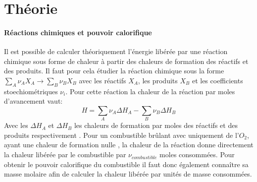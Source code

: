 \section{Théorie}


\paragraph*{Réactions chimiques et pouvoir calorifique}
Il est possible de calculer théoriquement l'énergie libérée par une réaction chimique sous forme de chaleur à partir des chaleurs de formation des réactifs et des produits. Il faut pour cela étudier la réaction chimique sous la forme \mbox{\(\sum_{A} \nu_A X_A \to \sum_{B} \nu_B X_B\)} avec les réactifs \(X_A\), les produits \(X_B\) et les coefficients stoechiométriques \(\nu_i\). Pour cette réaction la chaleur de la réaction par moles d'avancement vaut:
\begin{equation}
    H = \sum_{A} \nu_A \Delta H_A - \sum_{B} \nu_B \Delta H_B
    \label{eq:chaleur_réaction}
\end{equation}
Avec les \(\Delta H_A\) et \(\Delta H_B\) les chaleurs de formation par moles des réactifs et des produits respectivement \cite{cours-thermo}. Pour un combustible brûlant avec uniquement de l'\(O_2\), ayant une chaleur de formation nulle \cite{notice}, la chaleur de la réaction donne directement la chaleur libérée par le combustible par \(\nu_{combustible}\) moles consommées. Pour obtenir le pouvoir calorifique du combustible il faut donc également connaître sa masse molaire afin de calculer la chaleur libérée par unités de masse consommées.

